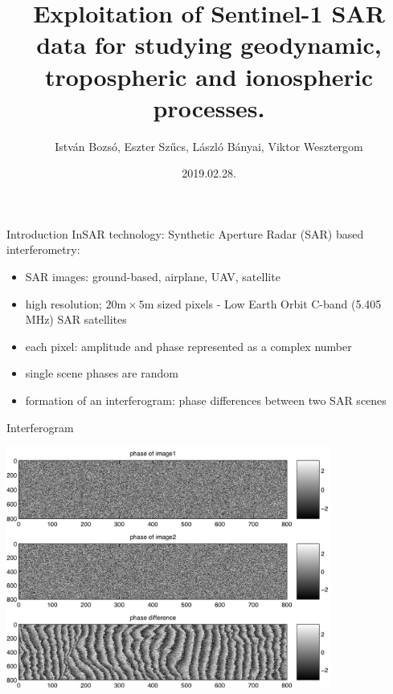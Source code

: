 \documentclass{beamer}
\title[H-SPACE, Budapest 2019]{Exploitation of Sentinel-1 SAR data for studying geodynamic, tropospheric and ionospheric processes.}
\author[Bozsó et al.]{István Bozsó, Eszter Szűcs, László Bányai, Viktor Wesztergom}
\institute[MTA CSFK GGI]{MTA CSFK Geodetic and Geophysical Institute}
\date{2019.02.28.}
\begin{document}
\begin{frame}
    \titlepage
\end{frame}

\begin{frame}{Introduction}
    InSAR technology: Synthetic Aperture Radar (SAR) based interferometry:
    \begin{itemize}
        \item SAR images: ground-based, airplane, UAV, satellite
        \item high resolution; $20 \mathrm{m} \times 5 \mathrm{m}$ sized pixels - Low Earth Orbit C-band (5.405 MHz) SAR satellites
        \item each pixel: amplitude and phase represented as a complex number
        \item single scene phases are random
        \item formation of an interferogram: phase differences between two SAR scenes
    \end{itemize}
\end{frame}

\begin{frame}{Interferogram}
    \begin{center}
        \includegraphics[width=0.8\textwidth]{insar_phase.png}
    \end{center}
\end{frame}
\end{document}
